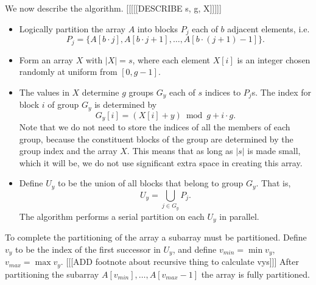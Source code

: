 \documentclass[sigconf]{acmart}
\renewcommand{\paragraph}[1]{\vspace{0.09in}\noindent{\bf \boldmath #1.}}
\theoremstyle{remark}
\theoremstyle{remark}
\begin{document}
\paragraph{Algorithm Description}
We now describe the algorithm.
[[[[[DESCRIBE s, g, X]]]]]
\begin{itemize}
	\item Logically partition the array $A$ into blocks $P_j$ each of $b$ adjacent elements, i.e. $${P_j = \{A[b\cdot j], A[b\cdot j + 1], \ldots, A[b\cdot (j+1)-1]\}}.$$
	\item Form an array $X$ with $|X|=s$, where each element $X[i]$ is an integer chosen randomly at uniform from $[0, g-1].$
	\item The values in $X$ determine $g$ groups $G_y$ each of $s$ indices to $P_j$s. The index for block $i$ of group $G_y$ is determined by
		$$G_y[i] = (X[i] + y) \bmod g + i\cdot g.$$
		Note that we do not need to store the indices of all the members of each group, because the constituent blocks of the group are determined by the group index and the array $X$. 
		This means that as long as $|s|$ is made small, which it will be, we do not use significant extra space in creating this array.  
	\item Define $U_y$ to be the union of all blocks that belong to group $G_y$. That is,
			$$U_y = \bigcup_{j\in G_y} P_j.$$ 
		The algorithm performs a serial partition on each $U_y$ in parallel.
\end{itemize}
To complete the partitioning of the array a subarray must be partitioned. 
Define $v_y$ to be the index of the first successor in $U_y$, and define $v_{min}=\min{v_y}$,  $v_{max}=\max{v_y}$. 
[[[ADD footnote about recursive thing to calculate vys]]]
After partitioning the subarray ${A[v_{min}],\ldots,A[v_{max}-1]}$ the array is fully partitioned.
\end{document}
